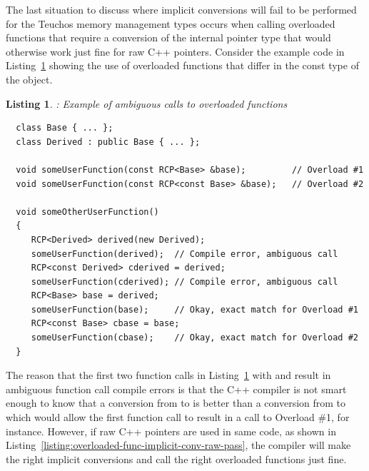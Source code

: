 \documentclass[pdf,ps2pdf,11pt]{SANDreport}
\newtheorem{listing}{Listing}
\begin{document}
The last situation to discuss where implicit conversions will fail to
be performed for the Teuchos memory management types occurs when
calling overloaded functions that require a conversion of the internal
pointer type that would otherwise work just fine for raw C++ pointers.
Consider the example code in
Listing~\ref{listing:overloaded-func-implicit-conv-problem} showing
the use of overloaded functions that differ in the const type of the
object.


{}\begin{listing}: Example of ambiguous calls to overloaded functions
\label{listing:overloaded-func-implicit-conv-problem}
{\small\begin{verbatim}
  class Base { ... };
  class Derived : public Base { ... };

  void someUserFunction(const RCP<Base> &base);         // Overload #1
  void someUserFunction(const RCP<const Base> &base);   // Overload #2

  void someOtherUserFunction()
  {
     RCP<Derived> derived(new Derived);
     someUserFunction(derived);  // Compile error, ambiguous call
     RCP<const Derived> cderived = derived;
     someUserFunction(cderived); // Compile error, ambiguous call
     RCP<Base> base = derived;
     someUserFunction(base);     // Okay, exact match for Overload #1
     RCP<const Base> cbase = base;
     someUserFunction(cbase);    // Okay, exact match for Overload #2
  }
\end{verbatim}}
\end{listing}


The reason that the first two function calls in
Listing~\ref{listing:overloaded-func-implicit-conv-problem} with
{} and {} result in
ambiguous function call compile errors is that the C++ compiler is not
smart enough to know that a conversion from {} to
{} is better than a conversion from
{} to {} which would allow the
first function call to result in a call to Overload \#1, for instance.
However, if raw C++ pointers are used in same code, as shown in
Listing~\ref{listing:overloaded-func-implicit-conv-raw-pass}, the
compiler will make the right implicit conversions and call the right
overloaded functions just fine.
\end{document}
